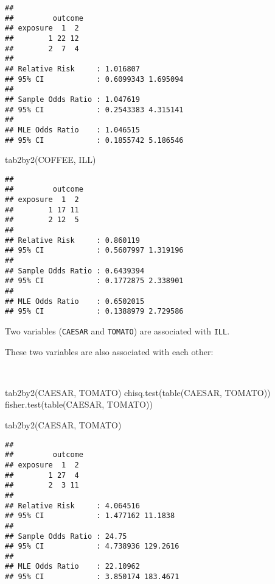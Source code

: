\documentclass[
  12pt,
  a4paper]{book}
\newenvironment{Shaded}{\begin{snugshade}}{\end{snugshade}}
\newcommand{\FunctionTok}[1]{\textcolor[rgb]{0.00,0.00,0.00}{#1}}
\newcommand{\NormalTok}[1]{#1}
\begin{document}
\begin{verbatim}
## 
##         outcome
## exposure  1  2
##        1 22 12
##        2  7  4
## 
## Relative Risk     : 1.016807 
## 95% CI            : 0.6099343 1.695094 
## 
## Sample Odds Ratio : 1.047619 
## 95% CI            : 0.2543383 4.315141 
## 
## MLE Odds Ratio    : 1.046515 
## 95% CI            : 0.1855742 5.186546
\end{verbatim}

\begin{Shaded}
\begin{Highlighting}[]
\FunctionTok{tab2by2}\NormalTok{(COFFEE, ILL)}
\end{Highlighting}
\end{Shaded}

\begin{verbatim}
## 
##         outcome
## exposure  1  2
##        1 17 11
##        2 12  5
## 
## Relative Risk     : 0.860119 
## 95% CI            : 0.5607997 1.319196 
## 
## Sample Odds Ratio : 0.6439394 
## 95% CI            : 0.1772875 2.338901 
## 
## MLE Odds Ratio    : 0.6502015 
## 95% CI            : 0.1388979 2.729586
\end{verbatim}

\newpage

Two variables (\texttt{CAESAR} and \texttt{TOMATO}) are associated with \texttt{ILL}.

These two variables are also associated with each other:

~

\begin{Shaded}
\begin{Highlighting}[]
\FunctionTok{tab2by2}\NormalTok{(CAESAR, TOMATO)}
\FunctionTok{chisq.test}\NormalTok{(}\FunctionTok{table}\NormalTok{(CAESAR, TOMATO))}
\FunctionTok{fisher.test}\NormalTok{(}\FunctionTok{table}\NormalTok{(CAESAR, TOMATO))}
\end{Highlighting}
\end{Shaded}

\begin{Shaded}
\begin{Highlighting}[]
\FunctionTok{tab2by2}\NormalTok{(CAESAR, TOMATO)}
\end{Highlighting}
\end{Shaded}

\begin{verbatim}
## 
##         outcome
## exposure  1  2
##        1 27  4
##        2  3 11
## 
## Relative Risk     : 4.064516 
## 95% CI            : 1.477162 11.1838 
## 
## Sample Odds Ratio : 24.75 
## 95% CI            : 4.738936 129.2616 
## 
## MLE Odds Ratio    : 22.10962 
## 95% CI            : 3.850174 183.4671
\end{verbatim}
\end{document}

